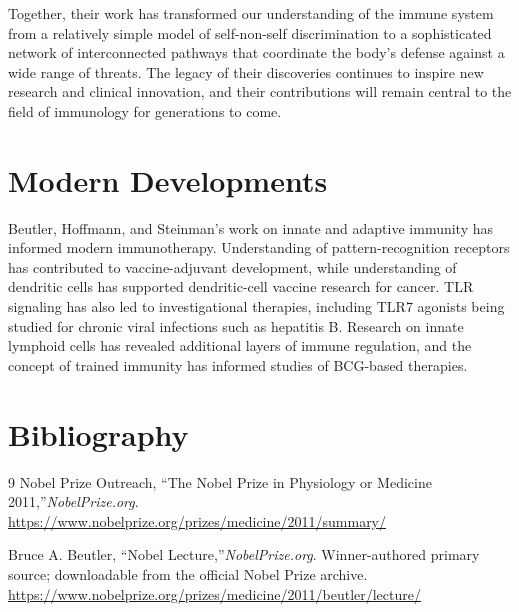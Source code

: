 Together, their work has transformed our understanding of the immune system from a relatively simple model of self-non-self discrimination to a sophisticated network of interconnected pathways that coordinate the body's defense against a wide range of threats. The legacy of their discoveries continues to inspire new research and clinical innovation, and their contributions will remain central to the field of immunology for generations to come.


\section{Modern Developments}

Beutler, Hoffmann, and Steinman's work on innate and adaptive immunity has informed modern immunotherapy. Understanding of pattern-recognition receptors has contributed to vaccine-adjuvant development, while understanding of dendritic cells has supported dendritic-cell vaccine research for cancer. TLR signaling has also led to investigational therapies, including TLR7 agonists being studied for chronic viral infections such as hepatitis B. Research on innate lymphoid cells has revealed additional layers of immune regulation, and the concept of trained immunity has informed studies of BCG-based therapies.


\section{Bibliography}

\begin{thebibliography}{9}
Nobel Prize Outreach, ``The Nobel Prize in Physiology or Medicine 2011,''\emph{NobelPrize.org}.\\
\url{https://www.nobelprize.org/prizes/medicine/2011/summary/}

Bruce A. Beutler, ``Nobel Lecture,''\emph{NobelPrize.org}. Winner-authored primary source; downloadable from the official Nobel Prize archive.\\
\url{https://www.nobelprize.org/prizes/medicine/2011/beutler/lecture/}
\end{thebibliography}

